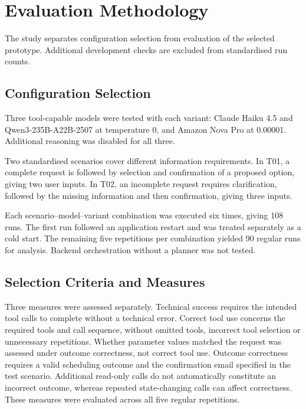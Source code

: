 \section{Evaluation Methodology}\label{sec:methodology}
The study separates configuration selection from evaluation of the selected prototype.
Additional development checks are excluded from standardised run counts.

\subsection{Configuration Selection}
Three tool-capable models were tested with each variant: Claude Haiku 4.5 and Qwen3-235B-A22B-2507 at temperature 0, and Amazon Nova Pro at 0.00001.
Additional reasoning was disabled for all three.

Two standardised scenarios cover different information requirements.
In T01, a complete request is followed by selection and confirmation of a proposed option, giving two user inputs.
In T02, an incomplete request requires clarification, followed by the missing information and then confirmation, giving three inputs.

Each scenario--model--variant combination was executed six times, giving 108 runs.
The first run followed an application restart and was treated separately as a cold start.
The remaining five repetitions per combination yielded 90 regular runs for analysis.
Backend orchestration without a planner was not tested.

\subsection{Selection Criteria and Measures}
Three measures were assessed separately.
Technical success requires the intended tool calls to complete without a technical error.
Correct tool use concerns the required tools and call sequence, without omitted tools, incorrect tool selection or unnecessary repetitions.
Whether parameter values matched the request was assessed under outcome correctness, not correct tool use.
Outcome correctness requires a valid scheduling outcome and the confirmation email specified in the test scenario.
Additional read-only calls do not automatically constitute an incorrect outcome, whereas repeated state-changing calls can affect correctness.
These measures were evaluated across all five regular repetitions.

